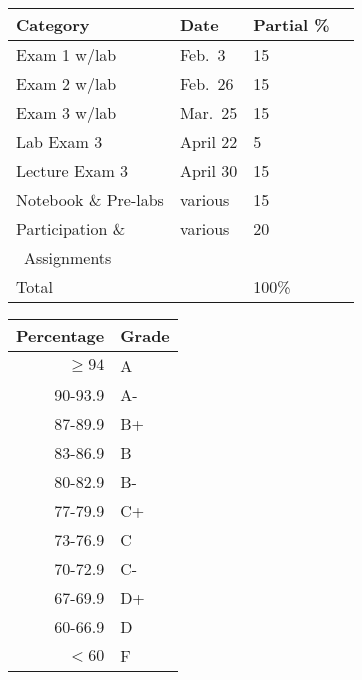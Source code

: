 \documentclass{tufte-handout}
\begin{document}
\begin{tabular}{l l l r}
Category &  Date & Partial \%  \\
\hline
 Exam 1 w/lab & Feb.\ 3 & 15 \\							%
 Exam 2 w/lab & Feb.\ 26 & 15 \\							%
 Exam 3 w/lab & Mar.\ 25 & 15 \\						%
 Lab Exam 3 & April 22 & 5 \\
 Lecture Exam 3 & April 30 & 15 \\ 
 Notebook \& Pre-labs & various & 15 \\							%
Participation \& &  various  & 20 \\
\, Assignments \\
\hline
Total & &   100\%
\end{tabular}


\begin{margintable}
\begin{tabular}{rl}
Percentage & Grade \\
\hline 
$\ge94$ & A \\
90-93.9 & A- \\
87-89.9 & B+ \\
83-86.9 & B \\
80-82.9 & B- \\
77-79.9 & C+ \\
73-76.9 & C \\
70-72.9 & C- \\
67-69.9 & D+ \\
60-66.9 & D \\
$<60$ & F \\
\hline
\end{tabular}
\end{margintable}
\end{document}
